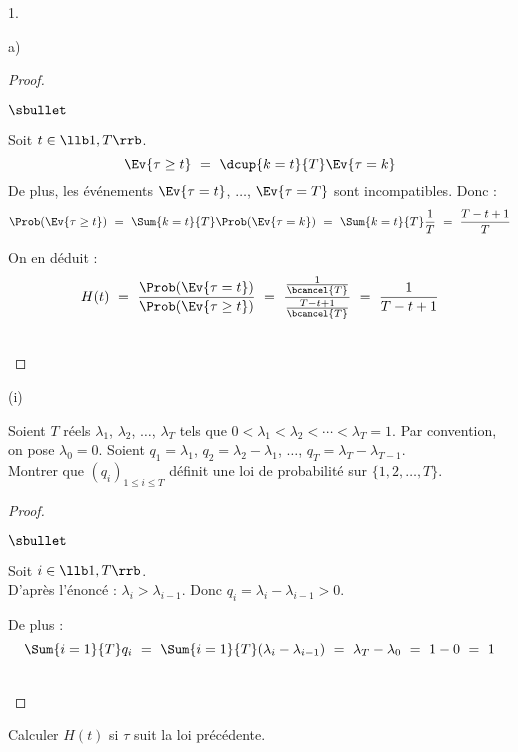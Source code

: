 \begin{noliste}{1.}
\begin{noliste}{a)}
\begin{proof}
\begin{noliste}{$\sbullet$}
	\item Soit $t\in \llb 1, T\rrb$.
	\[
	  \Ev{\tau \geq t} \ = \ \dcup{k=t}{T} \Ev{\tau =k}
	\]
	De plus, les événements $\Ev{\tau=t}$, $\ldots$, $\Ev{\tau =
	T}$ sont incompatibles. Donc :
	\[
	  \Prob(\Ev{\tau \geq t}) \ = \ \Sum{k=t}{T} 
	  \Prob(\Ev{\tau =k}) \ = \ \Sum{k=t}{T} \dfrac{1}{T}
	  \ = \ \dfrac{T-t+1}{T}
	\]
	
	\item On en déduit :
	\[
	  H(t) \ = \ \dfrac{\Prob(\Ev{\tau =t})}{\Prob(\Ev{\tau \geq 
	  t})} \ = \ \dfrac{\frac{1}{\bcancel{T}}}{\frac{T-t+1}
	  {\bcancel{T}}} \ = \ \dfrac{1}{T-t+1}
	\]
      \end{noliste}
      ~\\[-1cm]
    \end{proof}

    
    \item 
    \begin{nonoliste}{(i)}
      \item Soient $T$ réels $\lambda_1$, $\lambda_2$, $\ldots$, 
      $\lambda_T$ tels que $0 < \lambda_1 < \lambda_2 < \cdots < 
      \lambda_T=1$. Par convention, on pose $\lambda_0=0$. Soient 
      $q_1=\lambda_1$, $q_2=\lambda_2-\lambda_1$, $\ldots$, 
      $q_T=\lambda_T - \lambda_{T-1}$.\\
      Montrer que $(q_i)_{1\leq i \leq T}$ définit une loi de 
      probabilité sur $\{1,2, \ldots, T\}$.
      
      \begin{proof}~
        \begin{noliste}{$\sbullet$}
	  \item Soit $i\in \llb 1, T\rrb$.\\
	  D'après l'énoncé : $\lambda_i > \lambda_{i-1}$. Donc 
	  $q_i = \lambda_i - \lambda_{i-1} >0$.
	  
	  \item De plus :
	  \[
	    \Sum{i=1}{T} q_i \ = \ \Sum{i=1}{T} (\lambda_i - 
	    \lambda_{i-1}) \ = \ \lambda_T - \lambda_0 \ = \ 1-0
	    \ = \ 1
	  \]
        \end{noliste}
        ~\\[-1cm]
      \end{proof}

      
      \item Calculer $H(t)$ si $\tau$ suit la loi précédente.
      

\end{nonoliste}
\end{noliste}
\end{noliste}
